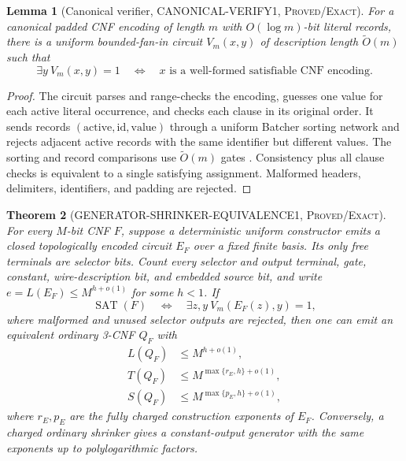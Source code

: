 \documentclass[11pt]{article}
\newtheorem{theorem}{Theorem}[section]
\newtheorem{lemma}[theorem]{Lemma}
\newcommand{\SAT}{\operatorname{SAT}}
\newcommand{\Exact}{\textsc{Proved/Exact}}
\begin{document}
\begin{lemma}[Canonical verifier, CANONICAL-VERIFY1, \Exact{}]
\label{lem:canonical}
For a canonical padded CNF encoding of length $m$ with
$O(\log m)$-bit literal records, there is a uniform bounded-fan-in circuit
$V_m(x,y)$ of description length $\widetilde O(m)$ such that
\[
 \exists y\ V_m(x,y)=1
 \quad\Longleftrightarrow\quad
 x\text{ is a well-formed satisfiable CNF encoding}.
\]
\end{lemma}

\begin{proof}
The circuit parses and range-checks the encoding, guesses one value for each
active literal occurrence, and checks each clause in its original order.
It sends records $(\mathrm{active},\mathrm{id},\mathrm{value})$ through a
uniform Batcher sorting network and rejects adjacent active records with the
same identifier but different values.  The sorting and record comparisons
use $\widetilde O(m)$ gates \cite{batcher1968sorting}.  Consistency plus all
clause checks is equivalent to a single satisfying assignment.  Malformed
headers, delimiters, identifiers, and padding are rejected.
\end{proof}

\begin{theorem}[GENERATOR-SHRINKER-EQUIVALENCE1, \Exact{}]
\label{thm:generator}
For every $M$-bit CNF $F$, suppose a deterministic uniform constructor emits
a closed topologically encoded circuit $E_F$ over a fixed finite basis.  Its
only free terminals are selector bits.  Count every selector and output
terminal, gate, constant, wire-description bit, and embedded source bit, and
write $e=L(E_F)\le M^{h+o(1)}$ for some $h<1$.  If
\begin{equation}
 \SAT(F)\quad\Longleftrightarrow\quad
 \exists z,y\ V_m(E_F(z),y)=1,
 \label{eq:generated-cover}
\end{equation}
where malformed and unused selector outputs are rejected, then one can emit
an equivalent ordinary 3-CNF $Q_F$ with
\begin{align*}
 L(Q_F)&\le M^{h+o(1)},\\
 T(Q_F)&\le M^{\max\{r_E,h\}+o(1)},\\
 S(Q_F)&\le M^{\max\{p_E,h\}+o(1)},
\end{align*}
where $r_E,p_E$ are the fully charged construction exponents of $E_F$.
Conversely, a charged ordinary shrinker gives a constant-output generator
with the same exponents up to polylogarithmic factors.
\end{theorem}
\end{document}
